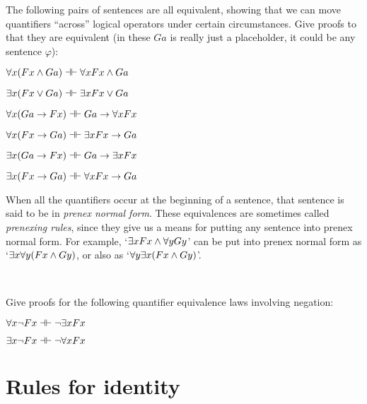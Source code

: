 \problempart
The following pairs of sentences are all equivalent, showing that we can move quantifiers ``across'' logical operators under certain circumstances.  Give proofs to that they are equivalent (in these $Ga$ is really just a placeholder, it could be any sentence $\varphi$):
\begin{earg}
\item $\forall x (Fx \eand Ga) \pequiv  \forall x Fx \eand Ga$
\item $\exists x (Fx \eor Ga) \pequiv \exists x Fx \eor Ga$
\item $\forall x(Ga \eif Fx) \pequiv Ga \eif \forall x Fx$
\item $\forall x(Fx \eif Ga) \pequiv \exists x Fx \eif Ga$
\item $\exists x(Ga \eif Fx) \pequiv Ga \eif \exists x Fx$
\item $\exists x(Fx \eif Ga) \pequiv \forall x Fx \eif Ga$
\end{earg}
When all the quantifiers occur at the beginning of a sentence, that sentence is said to be in \emph{prenex normal form}. These equivalences are sometimes called \emph{prenexing rules}, since they give us a means for putting any sentence into prenex normal form. For example, `$\exists x Fx \wedge \forall yGy$' can be put into prenex normal form as `$\exists x\forall y(Fx \wedge Gy)$, or also as `$\forall y \exists x(Fx \wedge Gy)$'.

\

\problempart Give proofs for the following quantifier equivalence laws involving negation:

\begin{earg}
\item $\forall x \enot Fx \pequiv \enot \exists xFx$
\item $\exists x \enot Fx \pequiv \enot \forall x Fx$
\end{earg}




\section{Rules for identity}\label{s:identityrules}

